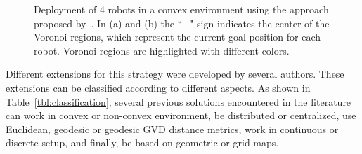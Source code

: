 \documentclass[smallcondensed]{svjour3}
\begin{document}
\begin{figure}[t]
\centering
{} 
\caption{Deployment of 4 robots in a convex environment using the approach proposed by~\cite{Cortes2004}. In (a) and (b) the ``+" sign indicates the center of the Voronoi regions, which represent the current goal position for each robot. Voronoi regions are highlighted with different colors.}
\label{fig:sampledeplyoment}
\end{figure}

Different extensions for this strategy were developed by several authors. These extensions can be classified according to different aspects.
As shown in Table~\ref{tbl:classification}, several previous solutions encountered in the literature can work in convex or non-convex environment, be distributed or centralized, use Euclidean, geodesic or geodesic GVD distance metrics, work in continuous or discrete setup, and finally, be based on geometric or grid maps. 
\end{document}
